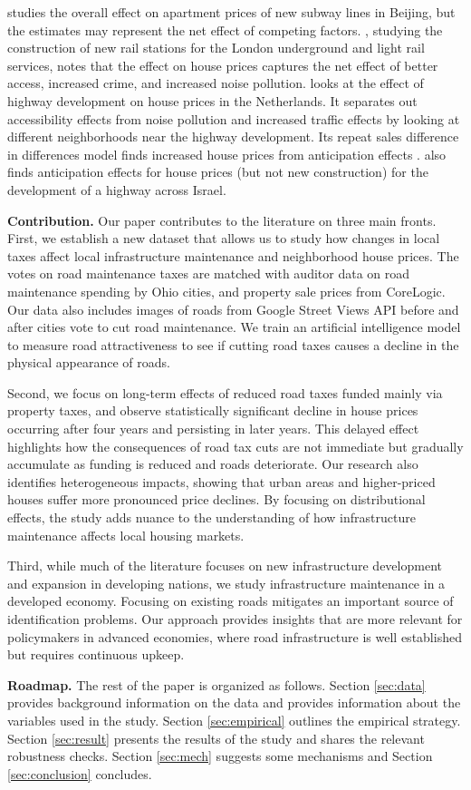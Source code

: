 \cite{li2016wheels} studies the overall effect on apartment prices of new subway lines in Beijing, but the estimates may represent the net effect of competing factors. \cite{gibbons2005valuing}, studying the construction of new rail stations for the London underground and light rail services, notes that the effect on house prices captures the net effect of better access, increased crime, and increased noise pollution. \cite{levkovich2016effects} looks at the effect of highway development on house prices in the Netherlands. It separates out accessibility effects from noise pollution and increased traffic effects by looking at different neighborhoods near the highway development. Its repeat sales difference in differences model finds increased house prices from anticipation effects \citep{kohlhase1991impact}. \cite{beenstock2016hedonic} also finds anticipation effects for house prices (but not new construction) for the development of a highway across Israel. 

{\bf Contribution.} Our paper contributes to the literature on three main fronts. First, we establish a new dataset that allows us to study how changes in local taxes affect local infrastructure maintenance and neighborhood house prices.  The votes on road maintenance taxes are matched with auditor data on road maintenance spending by Ohio cities, and property sale prices from CoreLogic. Our data also includes images of roads from Google Street Views API before and after cities vote to cut road maintenance. We train an artificial intelligence model to measure road attractiveness to see if cutting road taxes causes a decline in the physical appearance of roads.  

Second, we focus on long-term effects of reduced road taxes funded mainly via property taxes, and observe statistically significant decline in house prices occurring after four years and persisting in later years. This delayed effect highlights how the consequences of road tax cuts are not immediate but gradually accumulate as funding is reduced and roads deteriorate. Our research also identifies heterogeneous impacts, showing that urban areas and higher-priced houses suffer more pronounced price declines. By focusing on distributional effects, the study adds nuance to the understanding of how infrastructure maintenance affects local housing markets.

Third, while much of the literature focuses on new infrastructure development and expansion in developing nations, we study infrastructure maintenance in a developed economy.  Focusing on existing roads mitigates an important source of identification problems. Our approach provides insights that are more relevant for policymakers in advanced economies, where road infrastructure is well established but requires continuous upkeep. 

{\bf Roadmap.} The rest of the paper is organized as follows. Section \ref{sec:data} provides background information on the data and provides information about the variables used in the study. Section \ref{sec:empirical} outlines the empirical strategy. Section \ref{sec:result} presents the results of the study and shares the relevant robustness checks. Section \ref{sec:mech} suggests some mechanisms and Section \ref{sec:conclusion} concludes. 